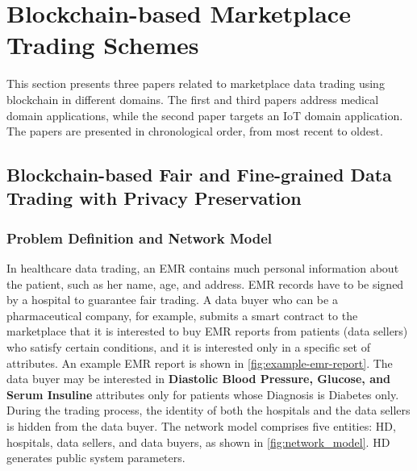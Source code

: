 \section{Blockchain-based Marketplace Trading Schemes }
\label{sec:blockchain-marketplace-trading-schemes}

This section presents three papers related to marketplace data trading using blockchain in different domains.
The first and third papers address medical domain applications, while the second paper targets an IoT domain application.
The papers are presented in chronological order, from most recent to oldest.

\subsection{Blockchain-based Fair and Fine-grained Data Trading with Privacy Preservation~\cite{xue2023blockchain}}
\label{sec:blockchain-based-medical-data-marketplace-23}

\subsubsection{Problem Definition and Network Model}
\label{sec:2023-problem-definition}
In healthcare data trading, an EMR contains much personal information about the patient, such as her name, age, and address.
EMR records have to be signed by a hospital to guarantee fair trading.
A data buyer who can be a pharmaceutical company, for example, submits a smart contract to the marketplace that it is interested to buy EMR reports from patients (data sellers) who satisfy certain conditions, and it is interested only in a specific set of attributes.
An example EMR report is shown in \cref{fig:example-emr-report}.
The data buyer may be interested in \textbf{Diastolic Blood Pressure, Glucose, and Serum Insuline} attributes only for patients whose Diagnosis is Diabetes only.
During the trading process, the identity of both the hospitals and the data sellers is hidden from the data buyer.
The network model comprises five entities: HD, hospitals, data sellers, and data buyers, as shown in \cref{fig:network_model}.
HD generates public system parameters.

